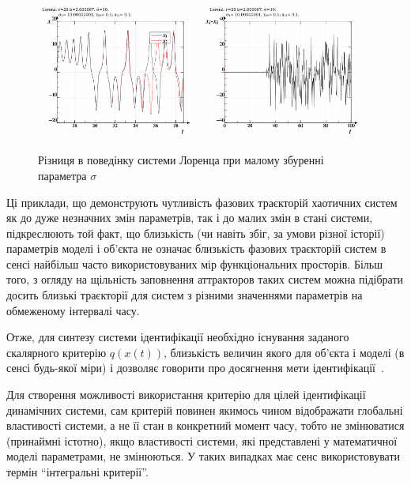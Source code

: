 \begin{figure}[htb!]
  \begin{center}
    \includegraphics[width=0.49\textwidth]{p/lor_diff-p_xx_sigma.png}
    \hfill
    \includegraphics[width=0.49\textwidth]{p/lor_diff-p_dx_sigma.png}
  \end{center}
  \caption{Різниця в поведінку системи Лоренца при малому збуренні параметра $ \sigma $}
  \label{atu:f:lor_diff_sigma}
\end{figure}

Ці приклади, що демонструють чутливість фазових траєкторій
хаотичних систем як до дуже незначних змін параметрів,
так і до малих змін в стані системи, підкреслюють той факт, що
близькість (чи навіть збіг, за умови різної історії) параметрів
моделі і об'єкта не означає близькість фазових траєкторій
систем в сенсі найбільш часто використовуваних мір
функціональних просторів. Більш того, з огляду на щільність
заповнення аттракторов таких систем можна підібрати досить
близькі траєкторії для систем з різними значеннями параметрів
на обмеженому інтервалі часу.

Отже, для синтезу системи ідентифікації необхідно існування заданого скалярного
критерію $q(x(t))$, близькість величин якого для об'єкта і моделі (в сенсі
будь-якої міри) і дозволяє говорити про досягнення мети ідентифікації~\cite{crit_method_is}.


Для створення можливості використання критерію для цілей ідентифікації
динамічних системи, сам критерій повинен якимось чином відображати глобальні
властивості системи, а не її стан в конкретний момент часу, тобто не
змінюватися (принаймні істотно), якщо властивості системи, які представлені у
математичної моделі параметрами, не змінюються. У таких випадках має сенс
використовувати термін ``інтегральні критерії''.

